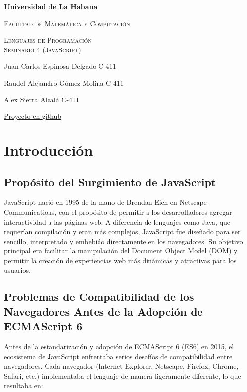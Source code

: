 \documentclass{article}
\begin{document}
\begin{titlepage}
      \centering
      {\bfseries\LARGE Universidad de La Habana \par}
      \vspace{1cm}
      {\scshape\Large Facultad de Matemática y Computación \par}
      \vspace{3cm}
      {\scshape\Huge Lenguajes de Programación\\ Seminario 4 (JavaScript) \par}
      \vfill

      {\Large Juan Carlos Espinosa Delgado C-411 \par}
      {\Large Raudel Alejandro Gómez Molina C-411 \par}
      {\Large Alex Sierra Alcalá C-411 \par}
      \vfill
      {\href{https://github.com/ARJ-Code/js-lp}{Proyecto en github} \par}
\end{titlepage}

\section{Introducción}

\subsection{Propósito del Surgimiento de JavaScript}

JavaScript nació en 1995 de la mano de Brendan Eich en Netscape Communications, con el propósito de permitir a los
desarrolladores agregar interactividad a las páginas web. A diferencia de lenguajes como Java, que requerían
compilación y eran más complejos, JavaScript fue diseñado para ser sencillo, interpretado y embebido directamente en
los navegadores. Su objetivo principal era facilitar la manipulación del Document Object Model (DOM) y permitir la
creación de experiencias web más dinámicas y atractivas para los usuarios.

\subsection{Problemas de Compatibilidad de los Navegadores Antes de la Adopción de ECMAScript 6}

Antes de la estandarización y adopción de ECMAScript 6 (ES6) en 2015, el ecosistema de JavaScript enfrentaba serios
desafíos de compatibilidad entre navegadores. Cada navegador (Internet Explorer, Netscape, Firefox, Chrome, Safari,
etc.) implementaba el lenguaje de manera ligeramente diferente, lo que resultaba en:
\end{document}
